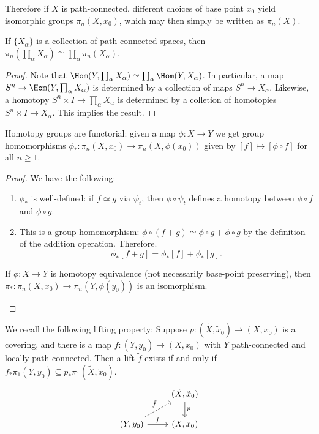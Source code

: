 \documentclass[ma3408.tex]{subfiles}
\begin{document}
\begin{Rem}
	Therefore if $X$ is path-connected, different choices of base point $x_0$ yield isomorphic groups $\pi_n(X,x_0)$, which may then simply be written as $\pi_n(X)$. 
\end{Rem}
\begin{Lem}
	If $\{ X_{\alpha} \}$ is a collection of path-connected spaces, then $\pi_n(\prod_{\alpha} X_{\alpha}) \cong \prod_{\alpha} \pi_n(X_{\alpha})$. 
\end{Lem}
\begin{proof}
	Note that $\Hom(Y,\prod_{\alpha} X_{\alpha}) \simeq \prod_{\alpha} \Hom(Y,X_{\alpha})$. In particular, a map $S^n \to \Hom(Y,\prod_{\alpha}X_{\alpha})$ is determined by a collection of maps $S^n \to X_{\alpha}$. Likewise, a homotopy $S^n \times I \to \prod_{\alpha} X_{\alpha}$ is determined by a colletion of homotopies $S^n \times I \to X_{\alpha}$. This implies the result. 
\end{proof}
\begin{Prop}
	Homotopy groups are functorial: given a map $\phi \colon X \to Y$ we get group homomorphisms $\phi_{\ast} \colon \pi_n(X,x_0) \to \pi_n(X,\phi(x_0))$ given by $[f] \mapsto [\phi \circ f]$ for all $n \ge 1$. 
\end{Prop}
\begin{proof}
We have the following:
	\begin{enumerate}
	\item $\phi_*$ is well-defined: if $f \simeq g$ via $\psi_t$, then $\phi \circ \psi_t$ defines a homotopy between $\phi \circ f$ and $\phi \circ g$. 
	\item This is a group homomorphism: $\phi \circ (f+g) \simeq \phi \circ g + \phi \circ g$ by the definition of the addition operation. Therefore. 
	\[
\phi_*[f+g] = \phi_*[f] + \phi_*[g]. 
	\]
\end{enumerate}
\begin{exercise}{}{}
	If $\phi \colon X \to Y$ is homotopy equivalence (not necessarily base-point preserving), then $\pi_* \colon \pi_n(X,x_0) \to \pi_n(Y,\phi(y_0))$ is an isomorphism.  
\end{exercise}
\end{proof}
\begin{Rem}
	We recall the following lifting property: Suppose $p \colon (\tilde X,\tilde x_0) \to (X,x_0)$ is a covering, and there is a map $f \colon (Y,y_0) \to (X,x_0)$ with $Y$ path-connected and locally path-connected. Then a lift $\tilde f$ exists if and only if $f_*\pi_1(Y,y_0) \subseteq p_*\pi_1(\tilde X,\tilde x_0)$. 
\[\begin{tikzcd}
	& {(\tilde X,\tilde x_0)} \\
	{(Y,y_0)} & {(X,x_0)}
	\arrow["f", from=2-1, to=2-2]
	\arrow["p",from=1-2, to=2-2]
	\arrow["{\tilde f}", dashed, from=2-1, to=1-2]
\end{tikzcd}\]

\end{Rem}
\end{document}
